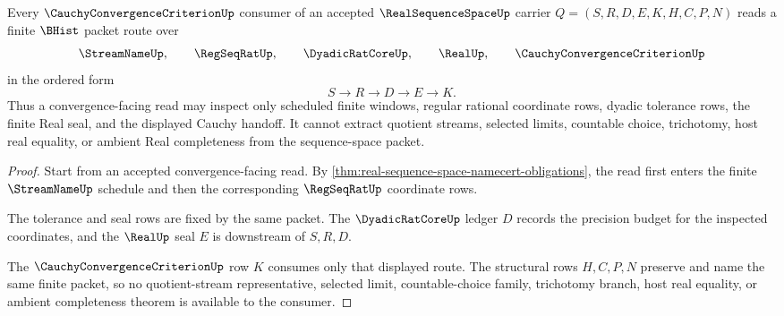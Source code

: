 \begin{theorem}
\label{thm:real-sequence-space-cauchy-criterion-handoff}
Every $\CauchyConvergenceCriterionUp$ consumer of an accepted $\RealSequenceSpaceUp$ carrier $Q=(S,R,D,E,K,H,C,P,N)$ reads a finite $\BHist$ packet route over
$$
\StreamNameUp,\qquad
\RegSeqRatUp,\qquad
\DyadicRatCoreUp,\qquad
\RealUp,\qquad
\CauchyConvergenceCriterionUp
$$
in the ordered form
$$
S \longrightarrow R \longrightarrow D \longrightarrow E \longrightarrow K .
$$
Thus a convergence-facing read may inspect only scheduled finite windows, regular rational coordinate rows, dyadic tolerance rows, the finite Real seal, and the displayed Cauchy handoff. It cannot extract quotient streams, selected limits, countable choice, trichotomy, host real equality, or ambient Real completeness from the sequence-space packet.
\end{theorem}
\begin{proof}
Start from an accepted convergence-facing read. By \autoref{thm:real-sequence-space-namecert-obligations}, the read first enters the finite $\StreamNameUp$ schedule and then the corresponding $\RegSeqRatUp$ coordinate rows.

The tolerance and seal rows are fixed by the same packet. The $\DyadicRatCoreUp$ ledger $D$ records the precision budget for the inspected coordinates, and the $\RealUp$ seal $E$ is downstream of $S,R,D$.

The $\CauchyConvergenceCriterionUp$ row $K$ consumes only that displayed route. The structural rows $H,C,P,N$ preserve and name the same finite packet, so no quotient-stream representative, selected limit, countable-choice family, trichotomy branch, host real equality, or ambient completeness theorem is available to the consumer.
\end{proof}

